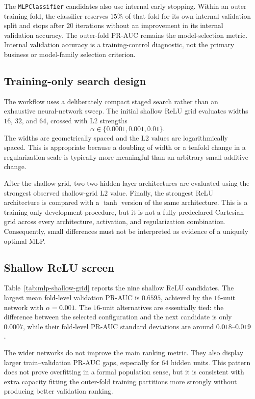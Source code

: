 The \texttt{MLPClassifier} candidates also use internal early stopping. Within an outer training fold, the classifier reserves \(15\%\) of that fold for its own internal validation split and stops after \(20\) iterations without an improvement in its internal validation accuracy. The outer-fold PR-AUC remains the model-selection metric. Internal validation accuracy is a training-control diagnostic, not the primary business or model-family selection criterion.

\subsection{Training-only search design}

The workflow uses a deliberately compact staged search rather than an exhaustive neural-network sweep. The initial shallow ReLU grid evaluates widths \(16\), \(32\), and \(64\), crossed with L2 strengths
\[
\alpha\in\{0.0001,0.001,0.01\}.
\]
The widths are geometrically spaced and the L2 values are logarithmically spaced. This is appropriate because a doubling of width or a tenfold change in a regularization scale is typically more meaningful than an arbitrary small additive change.

After the shallow grid, two two-hidden-layer architectures are evaluated using the strongest observed shallow-grid L2 value. Finally, the strongest ReLU architecture is compared with a \(\tanh\) version of the same architecture. This is a training-only development procedure, but it is not a fully predeclared Cartesian grid across every architecture, activation, and regularization combination. Consequently, small differences must not be interpreted as evidence of a uniquely optimal MLP.

\subsection{Shallow ReLU screen}

Table~\ref{tab:mlp-shallow-grid} reports the nine shallow ReLU candidates. The largest mean fold-level validation PR-AUC is \(0.6595\), achieved by the \(16\)-unit network with \(\alpha=0.001\). The \(16\)-unit alternatives are essentially tied: the difference between the selected configuration and the next candidate is only \(0.0007\), while their fold-level PR-AUC standard deviations are around \(0.018\)--\(0.019\).

The wider networks do not improve the main ranking metric. They also display larger train--validation PR-AUC gaps, especially for \(64\) hidden units. This pattern does not prove overfitting in a formal population sense, but it is consistent with extra capacity fitting the outer-fold training partitions more strongly without producing better validation ranking.

